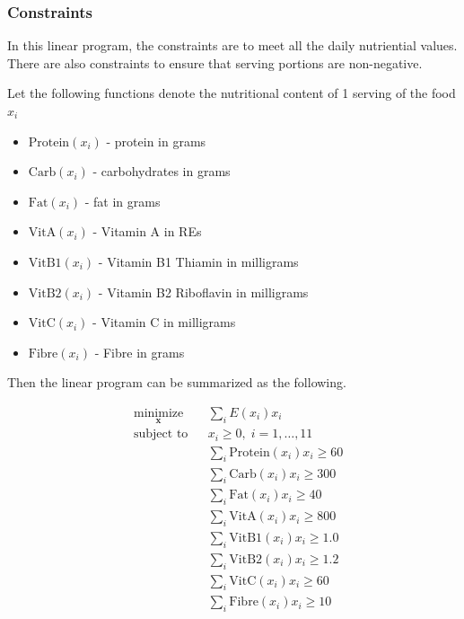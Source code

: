 \documentclass{article}
\begin{document}
    \subsubsection{Constraints}

    In this linear program, the constraints are to meet all the daily nutriential values. There are also constraints to ensure that serving portions are non-negative.

    Let the following functions denote the nutritional content of 1 serving of the food $x_i$

    \begin{itemize}
        \item $\text{Protein}(x_i)$ - protein in grams 
        \item $\text{Carb}(x_i)$ - carbohydrates in grams 
        \item $\text{Fat}(x_i)$ - fat in grams
        \item $\text{VitA}(x_i)$ - Vitamin A in REs 
        \item $\text{VitB1}(x_i)$ - Vitamin B1 Thiamin in milligrams 
        \item $\text{VitB2}(x_i)$ - Vitamin B2 Riboflavin in milligrams 
        \item $\text{VitC}(x_i)$ - Vitamin C in milligrams 
        \item $\text{Fibre}(x_i)$ - Fibre in grams 
    \end{itemize}

    Then the linear program can be summarized as the following.

    \begin{equation}
        \begin{aligned}
            & \underset{\mathbf{x}}{\text{minimize}} & & \sum_{i} E(x_i) x_i \\
            & \text{subject to} & & x_i \ge 0, \; i = 1, \ldots, 11 \\
            & & & \sum_{i} \text{Protein}(x_i) x_i \ge 60 \\
            & & & \sum_{i} \text{Carb}(x_i) x_i \ge 300 \\
            & & & \sum_{i} \text{Fat}(x_i) x_i \ge 40 \\
            & & & \sum_{i} \text{VitA}(x_i) x_i \ge 800 \\
            & & & \sum_{i} \text{VitB1}(x_i) x_i \ge 1.0 \\
            & & & \sum_{i} \text{VitB2}(x_i) x_i \ge 1.2 \\
            & & & \sum_{i} \text{VitC}(x_i) x_i \ge 60 \\
            & & & \sum_{i} \text{Fibre}(x_i) x_i \ge 10 \\
        \end{aligned}
    \end{equation}
    
\end{document}
